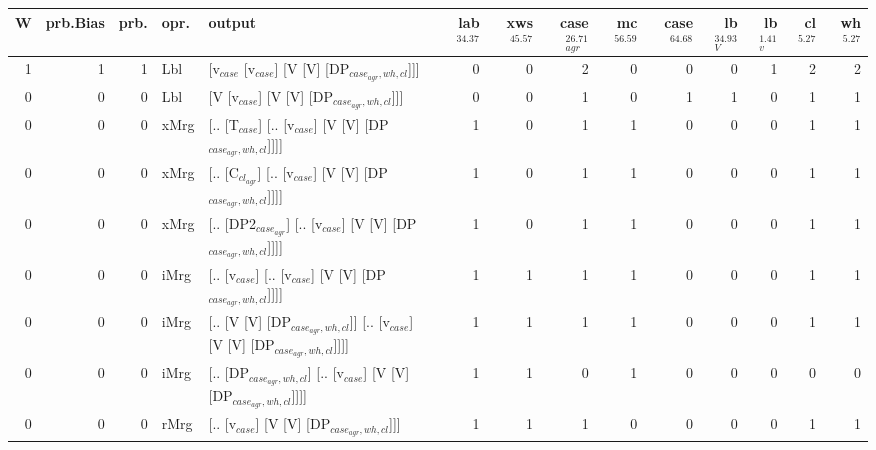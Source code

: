 \begin{tabularx}{\linewidth}{rrrlXrrrrrrrrr}
\hline
   W &   prb.Bias &   prb. & opr.   & output                                                                     &   lab$^{34.37}$ &   xws$^{45.57}$ &   case$_{agr}^{26.71}$ &   mc$^{56.59}$ &   case$^{64.68}$ &   lb$_{V}^{34.93}$ &   lb$_{v}^{1.41}$ &   cl$^{5.27}$ &   wh$^{5.27}$ \\
\hline
   1 &       1 &   1 & Lbl  & [v$_{case}$ [v$_{case}$] [V [V] [DP$_{case_{agr},wh,cl}$]]]                              &             0 &             0 &                  2 &            0 &              0 &              0 &             1 &        2 &        2 \\
   0 &       0 &   0 & Lbl  & [V [v$_{case}$] [V [V] [DP$_{case_{agr},wh,cl}$]]]                                   &             0 &             0 &                  1 &            0 &              1 &              1 &             0 &        1 &        1 \\
   0 &       0 &   0 & xMrg & [.. [T$_{case}$] [.. [v$_{case}$] [V [V] [DP$_{case_{agr},wh,cl}$]]]]                    &             1 &             0 &                  1 &            1 &              0 &              0 &             0 &        1 &        1 \\
   0 &       0 &   0 & xMrg & [.. [C$_{cl_{agr}}$] [.. [v$_{case}$] [V [V] [DP$_{case_{agr},wh,cl}$]]]]                  &             1 &             0 &                  1 &            1 &              0 &              0 &             0 &        1 &        1 \\
   0 &       0 &   0 & xMrg & [.. [DP2$_{case_{agr}}$] [.. [v$_{case}$] [V [V] [DP$_{case_{agr},wh,cl}$]]]]              &             1 &             0 &                  1 &            1 &              0 &              0 &             0 &        1 &        1 \\
   0 &       0 &   0 & iMrg & [.. [v$_{case}$] [.. [v$_{case}$] [V [V] [DP$_{case_{agr},wh,cl}$]]]]                    &             1 &             1 &                  1 &            1 &              0 &              0 &             0 &        1 &        1 \\
   0 &       0 &   0 & iMrg & [.. [V [V] [DP$_{case_{agr},wh,cl}$]] [.. [v$_{case}$] [V [V] [DP$_{case_{agr},wh,cl}$]]]] &             1 &             1 &                  1 &            1 &              0 &              0 &             0 &        1 &        1 \\
   0 &       0 &   0 & iMrg & [.. [DP$_{case_{agr},wh,cl}$] [.. [v$_{case}$] [V [V] [DP$_{case_{agr},wh,cl}$]]]]         &             1 &             1 &                  0 &            1 &              0 &              0 &             0 &        0 &        0 \\
   0 &       0 &   0 & rMrg & [.. [v$_{case}$] [V [V] [DP$_{case_{agr},wh,cl}$]]]                                  &             1 &             1 &                  1 &            0 &              0 &              0 &             0 &        1 &        1 \\
\hline
\end{tabularx}\endgroup\\
